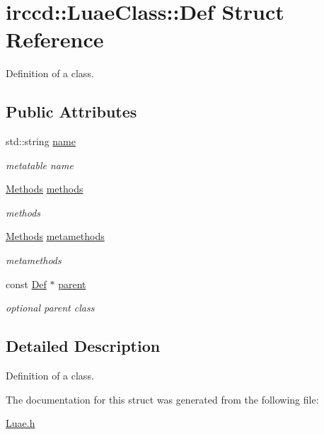 \hypertarget{a00024}{\section{irccd\-:\-:Luae\-Class\-:\-:Def Struct Reference}
\label{a00024}
}


Definition of a class.  


\subsection*{Public Attributes}
\begin{DoxyCompactItemize}
\item 
\hypertarget{a00024_a1f9f36a054daf01834a231c039d70c37}{std\-::string \hyperlink{a00024_a1f9f36a054daf01834a231c039d70c37}{name}}\label{a00024_a1f9f36a054daf01834a231c039d70c37}

\begin{DoxyCompactList}\small\item\em metatable name \end{DoxyCompactList}\item 
\hypertarget{a00024_a160febda4fd758555e5e69b7f2a09556}{\hyperlink{a00041_aa25ef6181e424ebf3d1fa42df2bdf145}{Methods} \hyperlink{a00024_a160febda4fd758555e5e69b7f2a09556}{methods}}\label{a00024_a160febda4fd758555e5e69b7f2a09556}

\begin{DoxyCompactList}\small\item\em methods \end{DoxyCompactList}\item 
\hypertarget{a00024_a83c6ceedfda7c976e6efe10cf2b5cd72}{\hyperlink{a00041_aa25ef6181e424ebf3d1fa42df2bdf145}{Methods} \hyperlink{a00024_a83c6ceedfda7c976e6efe10cf2b5cd72}{metamethods}}\label{a00024_a83c6ceedfda7c976e6efe10cf2b5cd72}

\begin{DoxyCompactList}\small\item\em metamethods \end{DoxyCompactList}\item 
\hypertarget{a00024_a439ab8b097574099874ffb2a73fdf6af}{const \hyperlink{a00024}{Def} $\ast$ \hyperlink{a00024_a439ab8b097574099874ffb2a73fdf6af}{parent}}\label{a00024_a439ab8b097574099874ffb2a73fdf6af}

\begin{DoxyCompactList}\small\item\em optional parent class \end{DoxyCompactList}\end{DoxyCompactItemize}


\subsection{Detailed Description}
Definition of a class. 

The documentation for this struct was generated from the following file\-:\begin{DoxyCompactItemize}
\item 
\hyperlink{a00089}{Luae.\-h}\end{DoxyCompactItemize}
